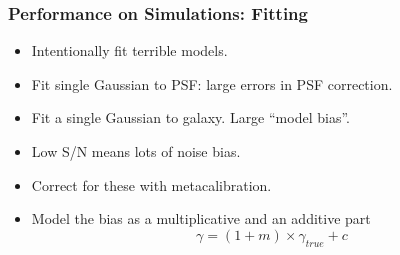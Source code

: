 \documentclass{beamer}
\newcommand{\mcal}{metacalibration}
\begin{document}
\frame
{
    \frametitle{Performance on Simulations: Fitting}

 
    \begin{itemize}
        \item Intentionally fit terrible models.

        \item Fit single Gaussian to PSF: large errors in
            PSF correction.

        \item Fit a single Gaussian to galaxy. Large ``model bias''.
            
        \item Low S/N means lots of noise bias.

        \item Correct for these with \mcal.

        \item Model the bias as a multiplicative and an additive part
            {\color{lightskyblue} 
                \begin{equation}
                    \gamma = (1 + m ) \times \gamma_{true} + c \nonumber
                \end{equation}
            }

    \end{itemize}
}
\end{document}

